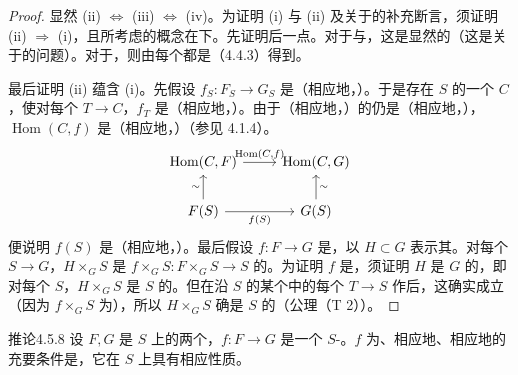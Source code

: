 \begin{proof}
显然 (ii) $\Leftrightarrow$ (iii) $\Leftrightarrow$ (iv)。为证明 (i) 与 (ii) 及关于的补充断言，须证明 (ii) $\Rightarrow$ (i)，且所考虑的概念在下。先证明后一点。对于与，这是显然的（这是关于的问题）。对于，则由每个都是（4.4.3）得到。

最后证明 (ii) 蕴含 (i)。先假设 $f_S:F_S\to G_S$ 是（相应地，）。于是存在 $S$ 的一个 $C$，使对每个 $T\to C$，$f_T$ 是（相应地，）。由于（相应地，）的仍是（相应地，），$\operatorname{Hom}(C,f)$ 是（相应地，）（参见 4.1.4）。
\[
\begin{tikzcd}
\operatorname{Hom}(C,F)\arrow[r,"{\operatorname{Hom}(C,f)}"]&\operatorname{Hom}(C,G)\\
F(S)\arrow[u,"\sim"]\arrow[r,"f(S)"']&G(S)\arrow[u,"\sim"']
\end{tikzcd}
\]
便说明 $f(S)$ 是（相应地，）。最后假设 $f:F\to G$ 是，以 $H\subset G$ 表示其。对每个 $S\to G$，$H\times_G S$ 是 $f\times_G S:F\times_G S\to S$ 的。为证明 $f$ 是，须证明 $H$ 是 $G$ 的，即对每个 $S$，$H\times_G S$ 是 $S$ 的。但在沿 $S$ 的某个中的每个 $T\to S$ 作后，这确实成立（因为 $f\times_G S$ 为），所以 $H\times_G S$ 确是 $S$ 的（公理（T 2））。
\end{proof}
\begin{SGAresult}{推论}{4.5.8}
设 $F,G$ 是 $S$ 上的两个，$f:F\to G$ 是一个 $S$-。$f$ 为、相应地、相应地的充要条件是，它在 $S$ 上具有相应性质。
\end{SGAresult}
